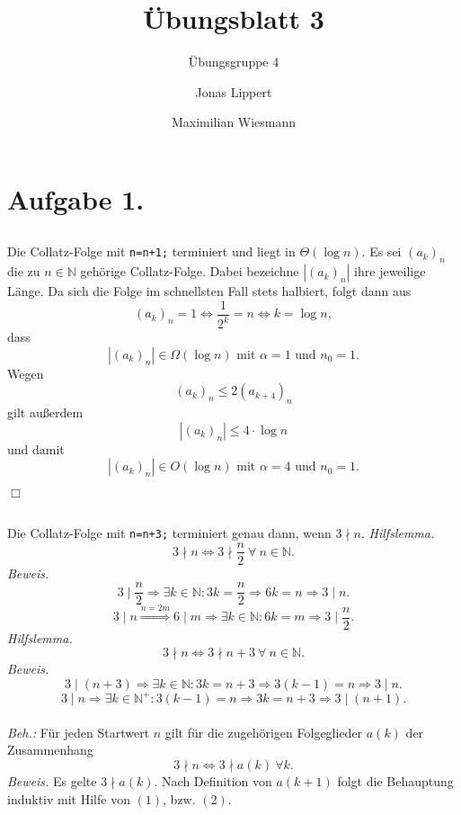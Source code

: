\documentclass[a4paper, 11pt]{scrartcl}
\title{Übungsblatt 3}
\author{Jonas Lippert \and Maximilian Wiesmann}
\subtitle{Übungsgruppe 4}
\date{}
\theoremstyle{dotless}
\begin{document}
	\maketitle
	\section*{Aufgabe 1.}
	\subsection{}
	Die Collatz-Folge mit \texttt{n=n+1;} terminiert und liegt in $\Theta(\log n)$.
	Es sei $(a_{k})_{n}$ die zu $n\in\mathbb{N}$ gehörige Collatz-Folge. Dabei bezeichne $|(a_{k})_{n}|$ ihre jeweilige Länge.
	Da sich die Folge im schnellsten Fall stets halbiert, folgt dann aus 
	\[
	(a_{k})_{n}=1\Leftrightarrow\frac{1}{2^{k}}=n\Leftrightarrow k=\log n,
	\]
	dass
	\[
	|(a_{k})_{n}|\in\Omega(\log n)\text{ mit }\alpha=1\text{ und }n_{0}=1.
	\]
	Wegen
	\[
	(a_{k})_{n}\leq2(a_{k+4})_{n}
	\]
	gilt außerdem 
	\[
	|(a_{k})_{n}|\leq4\cdot\log n
	\]
	und damit
	\[
	|(a_{k})_{n}|\in O(\log n)\text{ mit }\alpha=4\text{ und }n_{0}=1.
	\]
	\begin{flushright}
		$\Box$
	\end{flushright}
%
	\subsection{}
	Die Collatz-Folge mit \texttt{n=n+3;} terminiert genau dann, wenn $3\nmid n$.
	\emph{Hilfslemma.} 
	\begin{equation}
		3\nmid n \Leftrightarrow 3\nmid\frac{n}{2}~\forall~n\in\mathbb{N}.
	\end{equation}
	\emph{Beweis.}
	\[
		3\mid\frac{n}{2}\Rightarrow\exists k\in\mathbb{N}:3k=\frac{n}{2}\Rightarrow 6k=n\Rightarrow 3\mid n.
	\]
	\[
		3\mid n\overset{n=2m}{\Rightarrow} 6\mid m  \Rightarrow\exists k\in\mathbb{N}:6k=m \Rightarrow 3\mid\frac{n}{2}.
	\]
	\emph{Hilfslemma.}
	\begin{equation}
		3\nmid n \Leftrightarrow 3\nmid n+3~\forall~n\in\mathbb{N}.
	\end{equation}
	\emph{Beweis.}
	\[
		3\mid(n+3)\Rightarrow\exists k\in\mathbb{N}:3k=n+3\Rightarrow3(k-1)=n\Rightarrow3\mid n.
	\]
	\[
		3\mid n \Rightarrow\exists k\in\mathbb{N}^{+}:3(k-1)=n\Rightarrow3k=n+3\Rightarrow3\mid(n+1).
	\]\\
	\emph{Beh.:} Für jeden Startwert $n$ gilt für die zugehörigen Folgeglieder $a(k)$ der Zusammenhang
	\begin{equation}
		3\nmid n \Leftrightarrow 3\nmid a(k)~\forall k.
	\end{equation}
	\emph{Beweis.}
	Es gelte $3\nmid a(k)$. Nach Definition von $a(k+1)$ folgt die Behauptung induktiv mit Hilfe von $(1)$, bzw. $(2)$.
	
\end{document}
